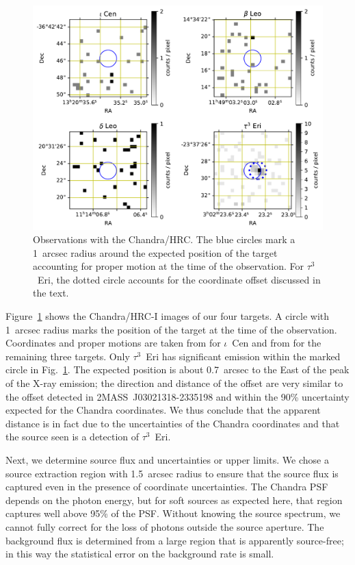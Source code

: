\documentclass[linenumbers]{aastex631}
\begin{document}
\begin{figure}
    \centering
    \includegraphics[width=\textwidth]{chandra.pdf}
    \caption{Observations with the Chandra/HRC. The blue circles mark a 1~arcsec radius around the expected position of the target accounting for proper motion at the time of the observation. For $\tau^3$~Eri, the dotted circle accounts for the coordinate offset discussed in the text.
    \label{fig:chandra}}
\end{figure}

Figure~\ref{fig:chandra} shows the Chandra/HRC-I images of our four
targets. A circle with 1~arcsec radius marks the position of the
target at the time of the observation. Coordinates and proper motions
are taken from \citet{2018yCat.1345....0G} for $\iota$~Cen and from
\cite{2007A&A...474..653V} for the remaining three targets. Only
$\tau^3$~Eri has significant emission within the marked circle in
Fig.~\ref{fig:chandra}. The expected position is about 0.7~arcsec to
the East of the peak of the X-ray emission; the direction and distance of
the offset are very similar to the offset detected in
2MASS~J03021318-2335198 and within the 90\% uncertainty expected for
the Chandra coordinates. We thus conclude that the apparent distance
is in fact due to the uncertainties of the Chandra coordinates and
that the source seen is a detection of $\tau^3$~Eri. 

Next, we determine source flux and uncertainties or upper limits.
We chose a source extraction region with 1.5~arcsec
radius to ensure that the source flux is captured even in the
presence of coordinate uncertainties. The Chandra
PSF depends on the photon energy, but for
soft sources as expected here, that region captures well above 95\%
of the PSF. Without knowing the source spectrum, we cannot fully
correct for the loss of photons outside the source aperture. 
The background flux is determined from
a large region that is apparently source-free; in this way the
statistical error on the background rate is small.
\end{document}
